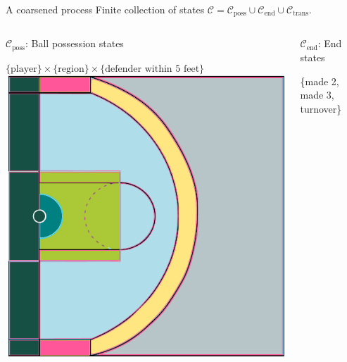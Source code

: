 \documentclass[10pt]{beamer}
\newcommand{\Cset}{\mathcal{C}}
\newcommand{\Ctrans}{\mathcal{C}_{\text{trans}}}
\newcommand{\Cposs}{\mathcal{C}_{\text{poss}}}
\newcommand{\Cend}{\mathcal{C}_{\text{end}}}
\begin{document}
\begin{frame}{A coarsened process}
Finite collection of states $\Cset = \Cposs \cup \Cend \cup \Ctrans$.
\begin{columns}[T] %
\begin{column}{.58\textwidth}
\begin{block}{$\Cposs$: Ball possession states}
\begin{center}
$\{\text{player}\} \times \{\text{region}\} \times \{\text{defender within 5 feet}\}$
\includegraphics[scale=0.4]{graphics/court_cropped}
\end{center}
\end{block}
\end{column}%
\hfill%
\begin{column}{.4\textwidth}
\begin{minipage}{\textwidth}
\pause
\begin{block}{$\Cend$: End states}
\begin{center}
\{made 2, made 3, turnover\}
\end{center}
\end{block}
\end{minipage}

\end{column}
\end{columns}
\end{frame}
\end{document}
